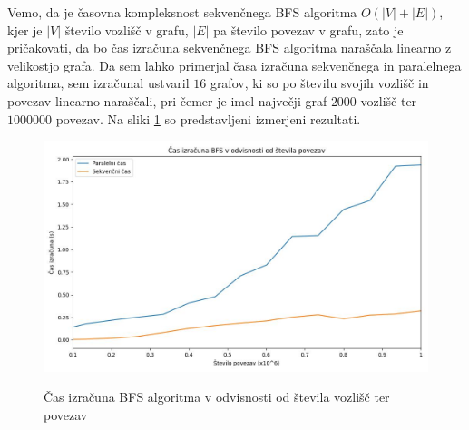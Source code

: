 \documentclass[mat1, tisk]{fmfdelo}
\begin{document}
Vemo, da je časovna kompleksnost sekvenčnega BFS algoritma $O(|V| + |E|)$, kjer je $|V|$ število vozlišč v grafu,
$|E|$ pa število povezav v grafu, zato je pričakovati, da bo čas izračuna sekvenčnega BFS algoritma naraščala linearno
z velikostjo grafa. Da sem lahko primerjal časa izračuna sekvenčnega in paralelnega algoritma, sem izračunal ustvaril
$16$ grafov, ki so po številu svojih vozlišč in povezav linearno naraščali, pri čemer je imel največji graf
$2000$ vozlišč ter $1000000$ povezav. Na sliki \ref{fig:bfs_calculation_time_by_graph_size} so predstavljeni izmerjeni
rezultati.

\begin{figure}[h!]
  \centering
  \caption{Čas izračuna BFS algoritma v odvisnosti od števila vozlišč ter povezav}
  \includegraphics[width=15cm]{slike/bfs_v_odvisnosti_od_velikosti_grafa.jpg}
  \label{fig:bfs_calculation_time_by_graph_size}
\end{figure}
\end{document}

